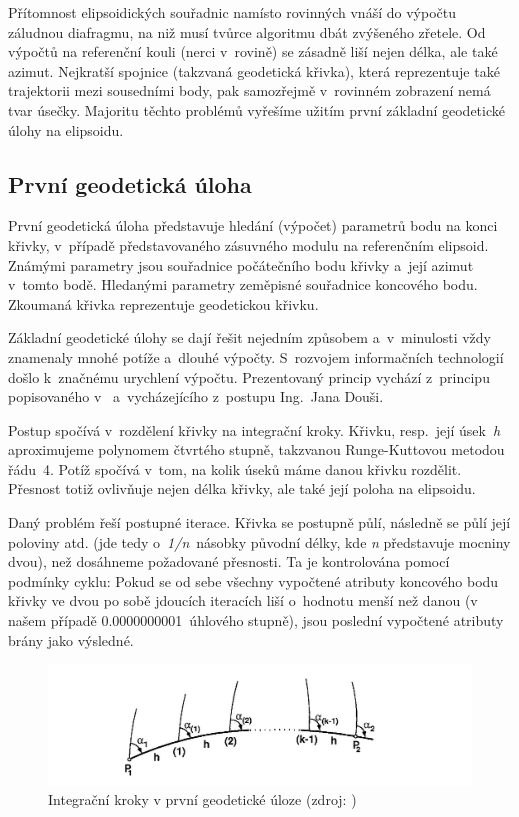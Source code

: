 Přítomnost elipsoidických souřadnic namísto rovinných vnáší do výpočtu záludnou diafragmu, na niž musí
tvůrce algoritmu dbát zvýšeného zřetele. Od výpočtů na referenční kouli (nerci v~rovině) se
zásadně liší nejen délka, ale také azimut. Nejkratší spojnice (takzvaná geodetická křivka), která
reprezentuje také trajektorii mezi sousedními body, pak samozřejmě
v~rovinném zobrazení nemá tvar úsečky. Majoritu těchto problémů vyřešíme užitím první základní
geodetické úlohy na elipsoidu. 

\subsection{První geodetická úloha}
\label{prvnigu}

První geodetická úloha představuje hledání (výpočet) parametrů bodu na konci křivky, v~případě
představovaného zásuvného modulu na referenčním elipsoid. Zná\-mými parametry jsou souřadnice počátečního
bodu křivky a~její azimut v~tomto bodě. Hledanými parametry zeměpisné souřadnice koncového bodu.
Zkoumaná křivka reprezentuje geodetickou křivku. 

Základní geodetické úlohy se dají řešit nejedním způsobem a~v~minulosti vždy znamenaly mnohé potíže
a~dlouhé výpočty. S~rozvojem informačních technologií došlo k~značnému urychlení výpočtu.
Prezentovaný princip vychází z~principu popisovaného v~\cite{vyssigeodezie} a~vycházejícího
z~postupu Ing.~Jana Douši. 

Postup spočívá v~rozdělení křivky na integrační kroky. Křivku, resp.~její úsek~\textit{h}
aproximujeme polynomem čtvrtého stupně, takzvanou Runge-Kuttovou metodou řádu~4. Potíž spočívá v~tom,
na kolik úseků máme danou křivku rozdělit. Přesnost totiž ovlivňuje nejen délka křivky, ale také její
poloha na elipsoidu. 

Daný problém řeší postupné iterace. Křivka se postupně půlí, následně se půlí její poloviny atd. (jde
tedy o~\textit{1/n}~násobky původní délky, kde \textit{n} představuje mocniny dvou), než dosáhneme
požadované přesnosti. Ta je kontrolována pomocí podmínky cyklu: Pokud se od sebe všechny vypočtené
atributy koncového bodu křivky ve dvou po sobě jdoucích iteracích liší o~hodnotu menší než danou
(v našem případě 0.0000000001~úhlového stupně), jsou poslední vypočtené atributy brány jako výsledné. 


  \begin{figure}[H]
   \centering
	\includegraphics[scale=0.4]{./pictures/prvnigu-integrace.png}
	\caption[Integrační kroky v první geodetické úloze]{Integrační kroky v první geodetické úloze
	(zdroj: \cite{vyssigeodezie})}
      \label{fig:prvnigu-integrace}
  \end{figure}





